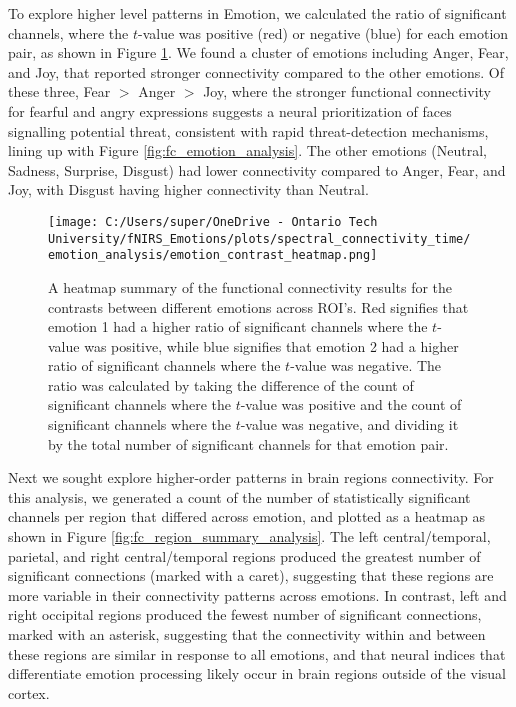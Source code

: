 To explore higher level patterns in Emotion, we calculated the ratio of significant channels, where the $t$-value was positive (red) or negative (blue) for each emotion pair, as shown in Figure \ref{fig:fc_emotion_summary_analysis}.
We found a cluster of emotions including Anger, Fear, and Joy, that reported stronger connectivity compared to the other emotions.
Of these three, Fear $>$ Anger $>$ Joy, where the stronger functional connectivity for fearful and angry expressions suggests a neural prioritization of faces signalling potential threat, consistent with rapid threat-detection mechanisms, lining up with Figure \ref{fig:fc_emotion_analysis}.
The other emotions (Neutral, Sadness, Surprise, Disgust) had lower connectivity compared to Anger, Fear, and Joy, with Disgust having higher connectivity than Neutral. 

\begin{figure}[H]
  \centering
  \texttt{[image: C:/Users/super/OneDrive - Ontario Tech University/fNIRS\_Emotions/plots/spectral\_connectivity\_time/emotion\_analysis/emotion\_contrast\_heatmap.png]}
  \caption[FC: Summary of Contrasts by Emotion Pair]{A heatmap summary of the functional connectivity results for the contrasts between different emotions across ROI's. 
  Red signifies that emotion 1 had a higher ratio of significant channels where the $t$-value was positive, while blue signifies that emotion 2 had a higher ratio of significant channels where the $t$-value was negative.
  The ratio was calculated by taking the difference of the count of significant channels where the $t$-value was positive and the count of significant channels where the $t$-value was negative, and dividing it by the total number of significant channels for that emotion pair.}
  \label{fig:fc_emotion_summary_analysis}
\end{figure}

Next we sought explore higher-order patterns in brain regions connectivity. 
For this analysis, we generated a count of the number of statistically significant channels per region that differed across emotion, and plotted as a heatmap as shown in Figure \ref{fig:fc_region_summary_analysis}.
The left central/temporal, parietal, and right central/temporal regions produced the greatest number of significant connections (marked with a caret), suggesting that these regions are more variable in their connectivity patterns across emotions. 
In contrast, left and right occipital regions produced the fewest number of significant connections, marked with an asterisk, suggesting that the connectivity within and between these regions are similar in response to all emotions, and that neural indices that differentiate emotion processing likely occur in brain regions outside of the visual cortex.

